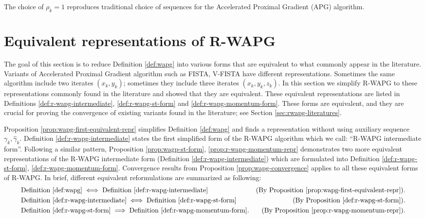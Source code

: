 \documentclass[12pt]{article}
\begin{document}
    \begin{remark}
        The choice of $\rho_k = 1$ reproduces traditional choice of sequences for the Accelerated Proximal Gradient (APG) algorithm.
    \end{remark}


\section{Equivalent representations of R-WAPG}\label{sec:rwapg-equiv-repr}
    The goal of this section is to reduce Definition \ref{def:wapg} into various forms that are equivalent to what commonly appear in the literature.
    Variants of Accelerated Proximal Gradient algorithm such as FISTA, V-FISTA have different representations.
    Sometimes the same algorithm include two iterates $(x_k, y_k)$; sometimes they include three iterates $(x_k, y_k, z_k)$.
    In this section we simplify R-WAPG to these representations commonly found in the literature and showed that they are equivalent.
    These equivalent representations are listed in Definitions \ref{def:r-wapg-intermediate}, \ref{def:r-wapg-st-form} and \ref{def:r-wapg-momentum-form}.
    These forms are equivalent, and they are crucial for proving the convergence of existing variants found in the literature; see Section \ref{sec:rwapg-literatures}.
    \par
    Proposition \ref{prop:wapg-first-equivalent-repr} simplifies Definition \ref{def:wapg} and finds a representation without using auxiliary sequence $\gamma_k, \hat \gamma_k$.
    Definition \ref{def:r-wapg-intermediate} states the first simplified form of the R-WAPG algorithm which we call: ``R-WAPG intermediate form''.
    Following a similar pattern, Proposition \ref{prop:wagp-st-form}, \ref{prop:r-wapg-momentum-repr} demonstrates two more equivalent representations of the R-WAPG intermediate form (Definition \ref{def:r-wapg-intermediate}) which are formulated into Definition \ref{def:r-wapg-st-form}, \ref{def:r-wapg-momentum-form}.
    Convergence results from Proposition \ref{prop:wapg-convergence} applies to all these equivalent forms of R-WAPG.
    In brief, different equivalent reformulations are summarized as following:
    \begin{align*}
        &\text{Definition \ref{def:wapg}}   \iff
        \text{Definition \ref{def:r-wapg-intermediate}}  & \text{(By Proposition \ref{prop:wapg-first-equivalent-repr}).}
        \\
        & \text{Definition \ref{def:r-wapg-intermediate}}
        \iff \text{Definition \ref{def:r-wapg-st-form}} & \text{(By Proposition \ref{def:r-wapg-st-form}).}
        \\
        &
        \text{Definition \ref{def:r-wapg-st-form}}\implies
        \text{Definition }\ref{def:r-wapg-momentum-form}.
        & \text{(By Proposition \ref{prop:r-wapg-momentum-repr})}.
    \end{align*}
\end{document}
